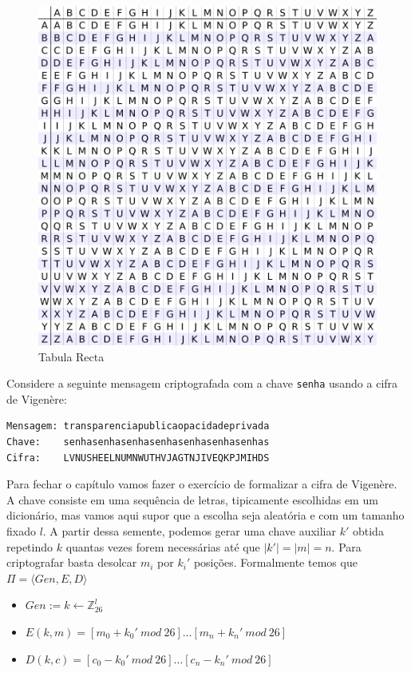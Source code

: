 \begin{figure}[htbp]
  \centering
  \includegraphics[width=.8\textwidth]{imagens/tabula-recta.png}
  \caption{Tabula Recta}
  \label{fig:tabula-recta}
\end{figure}


\begin{example}
  Considere a seguinte mensagem criptografada com a chave {\tt senha} usando a cifra de Vigenère:

\begin{verbatim}
Mensagem: transparenciapublicaopacidadeprivada
Chave:    senhasenhasenhasenhasenhasenhasenhas
Cifra:    LVNUSHEELNUMNWUTHVJAGTNJIVEQKPJMIHDS
\end{verbatim}  
\end{example}

Para fechar o capítulo vamos fazer o exercício de formalizar a cifra de Vigenère.
A chave consiste em uma sequência de letras, tipicamente escolhidas em um dicionário, mas vamos aqui supor que a escolha seja aleatória e com um tamanho fixado $l$.
A partir dessa semente, podemos gerar uma chave auxiliar $k'$ obtida repetindo $k$ quantas vezes forem necessárias até que $|k'| = |m| = n$.
Para criptografar basta desolcar $m_i$ por $k_i'$ posições.
Formalmente temos que $\Pi = \langle Gen, E, D \rangle$

\begin{itemize}
\item $Gen := k \leftarrow \mathbb{Z}_{26}^l$
\item $E(k, m) = [m_0 + {k_0}'\ mod\ 26] \dots [m_n + {k_n}'\ mod\ 26]$
\item $D(k, c) = [c_0 - {k_0}'\ mod\ 26] \dots [c_n - {k_n}'\ mod\ 26]$
\end{itemize}

